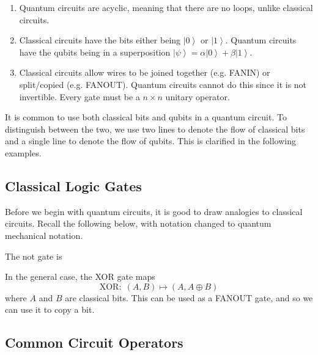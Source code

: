 \documentclass{article}
\newcommand{\ket}[1]{\ensuremath{\left|#1\right\rangle}}
\begin{document}
  \begin{enumerate} 
    \item Quantum circuits are acyclic, meaning that there are no loops, unlike classical circuits. 
    \item Classical circuits have the bits either being $\ket{0}$ or $\ket{1}$. Quantum circuits have the qubits being in a superposition $\ket{\psi} = \alpha \ket{0} + \beta \ket{1}$. 
    \item Classical circuits allow wires to be joined together (e.g. FANIN) or split/copied (e.g. FANOUT). Quantum circuits cannot do this since it is not invertible. Every gate must be a $n \times n$ unitary operator.
  \end{enumerate}
  
  It is common to use both classical bits and qubits in a quantum circuit. To distinguish between the two, we use two lines to denote the flow of classical bits and a single line to denote the flow of qubits. This is clarified in the following examples. 

  \subsection{Classical Logic Gates} 

    Before we begin with quantum circuits, it is good to draw analogies to classical circuits. Recall the following below, with notation changed to quantum mechanical notation. 

    \begin{definition}
      The not gate is 
    \end{definition}

    \begin{definition}
      
    \end{definition}

    \begin{definition}
      In the general case, the XOR gate maps
      \begin{equation} 
        \text{XOR}: \; (A, B) \mapsto (A, A \oplus B)
      \end{equation}
      where $A$ and $B$ are classical bits. This can be used as a FANOUT gate, and so we can use it to copy a bit. 
    \end{definition}

  \subsection{Common Circuit Operators}
\end{document}
